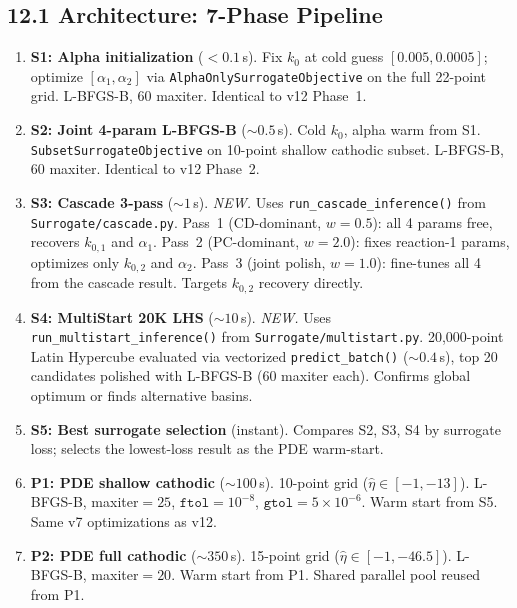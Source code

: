 \documentclass[11pt]{article}
\begin{document}
\subsection*{12.1 Architecture: 7-Phase Pipeline}

\begin{enumerate}
  \item \textbf{S1: Alpha initialization} ($<0.1$\,s).
        Fix $k_0$ at cold guess $[0.005, 0.0005]$; optimize
        $[\alpha_1, \alpha_2]$ via \texttt{AlphaOnlySurrogateObjective} on
        the full 22-point grid.  L-BFGS-B, 60 maxiter.  Identical to v12 Phase~1.

  \item \textbf{S2: Joint 4-param L-BFGS-B} (${\sim}0.5$\,s).
        Cold $k_0$, alpha warm from S1.
        \texttt{SubsetSurrogateObjective} on 10-point shallow cathodic subset.
        L-BFGS-B, 60 maxiter.  Identical to v12 Phase~2.

  \item \textbf{S3: Cascade 3-pass} (${\sim}1$\,s).  \textit{NEW.}
        Uses \texttt{run\_cascade\_inference()} from \texttt{Surrogate/cascade.py}.
        Pass~1 (CD-dominant, $w=0.5$): all 4 params free, recovers $k_{0,1}$
        and $\alpha_1$.  Pass~2 (PC-dominant, $w=2.0$): fixes reaction-1
        params, optimizes only $k_{0,2}$ and $\alpha_2$.  Pass~3 (joint
        polish, $w=1.0$): fine-tunes all 4 from the cascade result.
        Targets $k_{0,2}$ recovery directly.

  \item \textbf{S4: MultiStart 20K LHS} (${\sim}10$\,s).  \textit{NEW.}
        Uses \texttt{run\_multistart\_inference()} from
        \texttt{Surrogate/multistart.py}.  20,000-point Latin Hypercube
        evaluated via vectorized \texttt{predict\_batch()} (${\sim}0.4$\,s),
        top 20 candidates polished with L-BFGS-B (60 maxiter each).
        Confirms global optimum or finds alternative basins.

  \item \textbf{S5: Best surrogate selection} (instant).
        Compares S2, S3, S4 by surrogate loss; selects the lowest-loss
        result as the PDE warm-start.

  \item \textbf{P1: PDE shallow cathodic} (${\sim}100$\,s).
        10-point grid ($\hat\eta \in [-1, -13]$).  L-BFGS-B, maxiter${}=25$,
        $\texttt{ftol}=10^{-8}$, $\texttt{gtol}=5\times10^{-6}$.
        Warm start from S5.  Same v7 optimizations as v12.

  \item \textbf{P2: PDE full cathodic} (${\sim}350$\,s).
        15-point grid ($\hat\eta \in [-1, -46.5]$).  L-BFGS-B, maxiter${}=20$.
        Warm start from P1.  Shared parallel pool reused from P1.
\end{enumerate}
\end{document}
